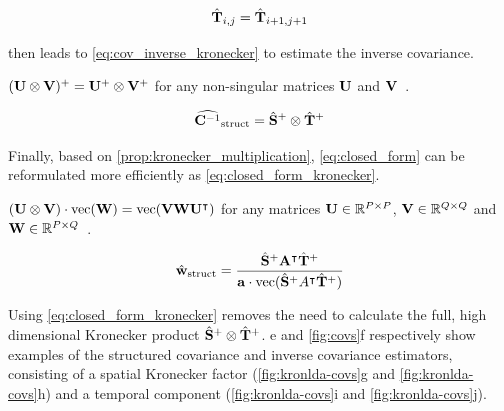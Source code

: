 	\begin{equation}
    \hat{\mathbf{T}}_{i,j} = \hat{\mathbf{T}}_{i+1,j+1}
		\label{eq:toeplitz}
	\end{equation}

	 then leads to
	\cref{eq:cov_inverse_kronecker} to estimate the inverse
	covariance.
	\begin{property}
    $(\mathbf{U} \otimes \mathbf{V})^+ = \mathbf{U}^+ \otimes \mathbf{V}^+$ for any non-singular
    matrices $\mathbf{U}$ and $\mathbf{V}$~\cite{Langville2004}.
		\label{prop:inverse_kronecker}
	\end{property}

	\begin{equation}
    \widehat{\mathbf{C}^{-1}}_\text{struct} = \hat{\mathbf{S}}^+ \otimes \hat{\mathbf{T}}^+
		\label{eq:cov_inverse_kronecker}
	\end{equation}

	Finally, based on \cref{prop:kronecker_multiplication},
	\cref{eq:closed_form} can be reformulated more efficiently as
	\cref{eq:closed_form_kronecker}.
	\begin{property}
    $(\mathbf{U}\otimes \mathbf{V})\cdot\text{vec}(\mathbf{W}) =
    \text{vec}(\mathbf{V}\mathbf{W}\mathbf{U}^\intercal)$
    for any matrices $\mathbf{U}\in\mathbb{R}^{P\times P}$,
    $\mathbf{V}\in\mathbb{R}^{Q\times Q}$ and $\mathbf{W}\in\mathbb{R}^{P\times Q}$~\cite{Loan2000}.
		\label{prop:kronecker_multiplication}
	\end{property}

	\begin{equation}
		\hat{\mathbf{w}}_\text{struct} =
    \frac{\hat{\mathbf{S}}^+\mathbf{A}^\intercal\hat{\mathbf{T}}^+}
    {\mathbf{a}\cdot\text{vec}(\hat{\mathbf{S}}^+A^\intercal\hat{\mathbf{T}}^+)}
		\label{eq:closed_form_kronecker}
	\end{equation}

	Using \cref{eq:closed_form_kronecker} removes the need to calculate the
  full, high dimensional Kronecker product $\hat{\mathbf{S}}^+\otimes
    \hat{\mathbf{T}}^+$.
	e and \cref{fig:covs}f respectively show examples of the
	structured covariance and inverse covariance estimators,
	consisting of a spatial Kronecker factor (\cref{fig:kronlda-covs}g and
	\cref{fig:kronlda-covs}h) and a temporal component (\cref{fig:kronlda-covs}i and
	\cref{fig:kronlda-covs}j).

